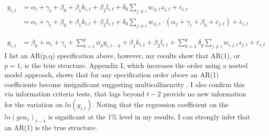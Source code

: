 
\begin{align}
    \label{eq:dyn-panel_structural}
    y_{i,t} &= \alpha_i + \gamma_t + \beta_0
                + \beta_1 k_{i,t}
                + \beta_2 l_{i,t}
                + \delta_0 \sum_{j\neq i} w_{ij,t}z_{j,t}
                + \varepsilon_{i,t}
    \\
    &= \alpha_i + \gamma_t + \beta_0
                + \beta_1 k_{i,t}
                + \beta_2 l_{i,t}
                + \delta_0 \sum_{j\neq i} w_{ij,t} \cdot
                    (\alpha_j + \gamma_t + \beta_0 + \varepsilon_{j,t})
                + \varepsilon_{i,t}
\end{align}

\begin{align}
    y_{i,t} &= \beta_0 + \alpha_i + \gamma_t
                + \sum_{k=1}^p \phi_k y_{i,t-k}
                + \beta_1 k_{i,t}
                + \beta_2 l_{i,t}
                + \sum_{k=1}^q \delta_q \sum_{j\neq i} w_{i,j,t}z_{j,t}
                + \varepsilon_{i,t}
\end{align}
%
I list an AR(p,q) specification above,
however, my results show that AR(1), or $p=1$, is the true structure.
Appendix I, which increases the order using a nested model approach,
shows that for any specification order above an AR(1)
coefficients become insignificant suggesting multicollinearity .
I also confirm this via information criteria tests, 
that lags beyond $t-2$ provide no new information for the variation on $ln(y_{i,t})$.
Noting that the regression coefficient on the $ln(gva_1)_{t-1}$ is significant at the 1\% level
in my results, I can strongly infer that an AR(1) is the true structure.
\par
{}
